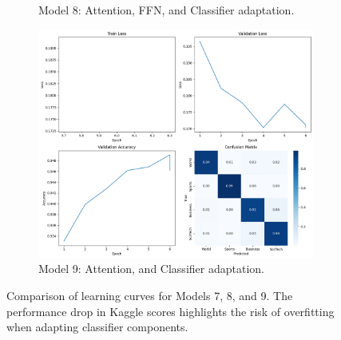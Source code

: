 \documentclass[letterpaper]{article}
\begin{document}
\begin{figure}[h]
\begin{subfigure}[b]{0.15\textwidth}
        \caption{Model 8: Attention, FFN, and Classifier adaptation.}
        \label{fig:model8}
    \end{subfigure}
    \begin{subfigure}[b]{0.15\textwidth}
        \centering
        \includegraphics[width=\linewidth]{images/model_6.png}
        \caption{Model 9: Attention, and Classifier adaptation.}
        \label{fig:model9}
    \end{subfigure}
    \caption{Comparison of learning curves for Models 7, 8, and 9. The performance drop in Kaggle scores highlights the risk of overfitting when adapting classifier components.}
    \label{fig:module-adaptation}
\end{figure}
\end{document}
